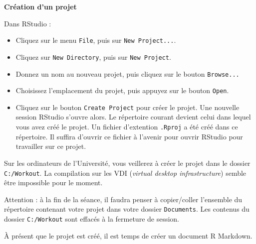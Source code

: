 \documentclass[
  11pt,
]{book}
\providecommand{\tightlist}{%
  \setlength{\itemsep}{0pt}\setlength{\parskip}{0pt}}
\numberwithin{equation}{section}
\numberwithin{countremarque}{section}
\newenvironment{greenbox}{
  \begin{tcolorbox}[breakable, colback=vert,coltext=black,
                  colframe=grisfonce]}
 {\end{tcolorbox}}
\newenvironment{redbox}{
  \begin{tcolorbox}[breakable, colback=rouge,coltext=white,
                  colframe=grisfonce]}
 {\end{tcolorbox}}
\begin{document}
\begin{greenbox}

\textbf{Création d'un projet}

Dans RStudio :

\begin{itemize}
\tightlist
\item
  Cliquez sur le menu \texttt{File}, puis sur \texttt{New\ Project...}.
\item
  Cliquez sur \texttt{New\ Directory}, puis sur \texttt{New\ Project}.
\item
  Donnez un nom au nouveau projet, puis cliquez sur le bouton \texttt{Browse...}
\item
  Choisissez l'emplacement du projet, puis appuyez sur le bouton \texttt{Open}.
\item
  Cliquez sur le bouton \texttt{Create\ Project} pour créer le projet. Une nouvelle session RStudio s'ouvre alors. Le répertoire courant devient celui dans lequel vous avez créé le projet. Un fichier d'extention \texttt{.Rproj} a été créé dans ce répertoire. Il suffira d'ouvrir ce fichier à l'avenir pour ouvrir RStudio pour travailler sur ce projet.
\end{itemize}

\end{greenbox}

\begin{redbox}
Sur les ordinateurs de l'Université, vous veillerez à créer le projet dans le dossier \texttt{C:/Workout}. La compilation sur les VDI (\emph{virtual desktop infrastructure}) semble être impossible pour le moment.

Attention : à la fin de la séance, il faudra penser à copier/coller l'ensemble du répertoire contenant votre projet dans votre dossier \texttt{Documents}. Les contenus du dossier \texttt{C:/Workout} sont effacés à la fermeture de session.

\end{redbox}

À présent que le projet est créé, il est temps de créer un document R Markdown.
\end{document}
